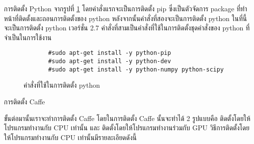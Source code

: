   การติดตั้ง Python
  จากรูปที่ \ref{python1} โดยคำสั่งแรกจะเป็นการติดตั้ง pip ซึ่งเป็นตัวจัดการ package ที่ทำหน้าที่ติดตั้งและถอนการติดตั้งของ python หลังจากนั้นคำสั่งที่สองจะเป็นการติดตั้ง python ในที่นี้จะเป็นการติดตั้ง python เวอร์ชั่น 2.7 คำสั่งที่สามเป็นคำสั่งที่ใช้ในการติดตั้งชุดคำสั่งของ python ที่จำเป็นในการใช้งาน
  \begin{figure}[t]
\begin{lstlisting}
       #sudo apt-get install -y python-pip
       #sudo apt-get install -y python-dev
       #sudo apt-get install -y python-numpy python-scipy	
\end{lstlisting}
\caption{คำสั่งที่ใช้ในการติดตั้ง python}
\label{python1}
\hrulefill
  \end{figure}
  
  การติดตั้ง Caffe
  
  ขั้นต่อมานั้นเราจะทำการติดตั้ง Caffe โดยในการติดตั้ง Caffe นั้นจะทำได้ 2 รูปแบบคือ ติดตั้งโดยให้โปรแกรมทำงานกับ CPU เท่านั้น และ ติดตั้งโดยให้โปรแกรมทำงานร่วมกับ GPU
  วิธีการติดตั้งโดยให้โปรแกรมทำงานกับ CPU เท่านั้นมีรายละเอียดดังนี้

